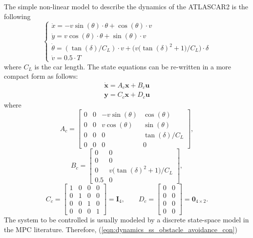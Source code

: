 \documentclass[conference, 11pt]{IEEEtran}
\begin{document}
The simple non-linear model to describe the dynamics of the ATLASCAR2 is the following
\begin{equation*}
	\label{eqn:dynamics_model_obstacle_avoidance}
	\left \{ \begin{array}{llll}
	\dot{x} = -v\sin(\theta)\cdot\theta+\cos(\theta)\cdot v\\
	\dot{y} = v\cos(\theta)\cdot\theta+\sin(\theta)\cdot v\\
	\dot{\theta} =(\tan(\delta)/C_L)\cdot v+ \bigg(v\bigg(\tan(\delta)^2+1\bigg)/C_L\bigg)\cdot \delta\\
	\dot{v} =0.5\cdot T
	\end{array} 
	\right .
\end{equation*}
where $C_L$ is the car length. The state equations can be re-written in a more compact form as follows:
\begin{equation}
	\label{eqn:dynamics_ss_obstacle_avoidance_con}
	\begin{array}{ll}
	\dot{\textbf{x}} =A_c \textbf{x}+ B_c \textbf{u}\\
	\textbf{y} =C_c \textbf{x} + D_c \textbf{u}
	\end{array}
\end{equation}
where
\[ 
A_c=\begin{bmatrix}
0&0&-v\sin(\theta)&\cos(\theta)\\
0&0&v\cos(\theta)&\sin(\theta)\\
0&0&0&\tan(\delta)/C_L\\
0&0&0&0
\end{bmatrix},
\]
\[
B_c=\begin{bmatrix}
0&0\\
0&0\\
0&v\bigg(\tan(\delta)^2+1\bigg)/C_L\\
0.5&0
\end{bmatrix},
\]
\[
C_c=\begin{bmatrix}
1&0&0&0\\
0&1&0&0\\
0&0&1&0\\
0&0&0&1
\end{bmatrix} = \textbf{I}_4, 
\qquad
D_c=\begin{bmatrix}
0&0\\
0&0\\
0&0\\
0&0
\end{bmatrix} = \textbf{0}_{4\times2}. 
\]
The system to be controlled is usually modeled by a discrete state-space model in the MPC literature. Therefore, (\ref{eqn:dynamics_ss_obstacle_avoidance_con})
\end{document}
